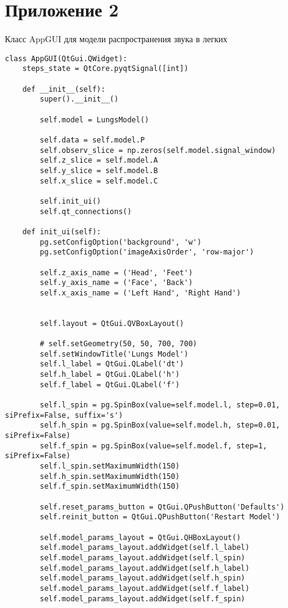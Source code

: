 \documentclass[../main.tex]{subfiles}
\begin{document}
\section{Приложение 2}
\label{appendix2}
Класс AppGUI для модели распространения звука в легких

\begin{lstlisting}
class AppGUI(QtGui.QWidget):
    steps_state = QtCore.pyqtSignal([int])

    def __init__(self):
        super().__init__()
        
        self.model = LungsModel()

        self.data = self.model.P
        self.observ_slice = np.zeros(self.model.signal_window)
        self.z_slice = self.model.A
        self.y_slice = self.model.B
        self.x_slice = self.model.C

        self.init_ui()
        self.qt_connections()

    def init_ui(self):
        pg.setConfigOption('background', 'w')
        pg.setConfigOption('imageAxisOrder', 'row-major')

        self.z_axis_name = ('Head', 'Feet')
        self.y_axis_name = ('Face', 'Back')
        self.x_axis_name = ('Left Hand', 'Right Hand')


        self.layout = QtGui.QVBoxLayout()

        # self.setGeometry(50, 50, 700, 700)
        self.setWindowTitle('Lungs Model')
        self.l_label = QtGui.QLabel('dt')
        self.h_label = QtGui.QLabel('h')
        self.f_label = QtGui.QLabel('f')

        self.l_spin = pg.SpinBox(value=self.model.l, step=0.01, siPrefix=False, suffix='s')
        self.h_spin = pg.SpinBox(value=self.model.h, step=0.01, siPrefix=False)
        self.f_spin = pg.SpinBox(value=self.model.f, step=1, siPrefix=False)
        self.l_spin.setMaximumWidth(150)
        self.h_spin.setMaximumWidth(150)
        self.f_spin.setMaximumWidth(150)

        self.reset_params_button = QtGui.QPushButton('Defaults')
        self.reinit_button = QtGui.QPushButton('Restart Model')
        
        self.model_params_layout = QtGui.QHBoxLayout()
        self.model_params_layout.addWidget(self.l_label)
        self.model_params_layout.addWidget(self.l_spin)
        self.model_params_layout.addWidget(self.h_label)
        self.model_params_layout.addWidget(self.h_spin)
        self.model_params_layout.addWidget(self.f_label)
        self.model_params_layout.addWidget(self.f_spin)


\end{lstlisting}
\end{document}
